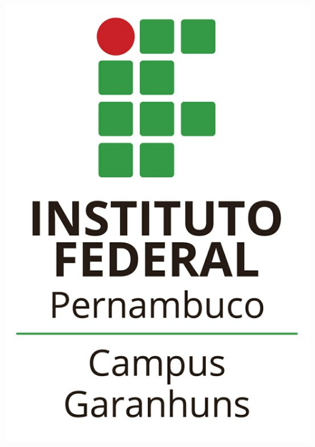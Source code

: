 \begin{center}
\includegraphics[scale=.10]{./img/logo-ifpe.png}\\
\textbf{\textsc{\instituicao}}\\
\textbf{\textsc{\campus}}\\
\textbf{\textsc{\curso}}


\vspace*{5cm}
\textbf{\thetitle}\\
\textbf{\theauthor}

\vspace*{\fill}
\localdefesa\\
\thedate
\end{center}

